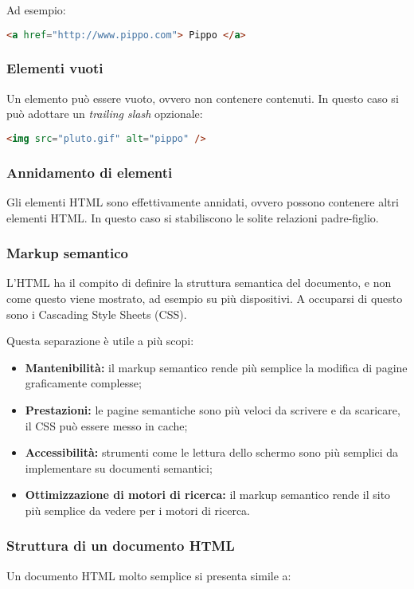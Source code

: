 \documentclass[a4paper,11pt]{article}
\begin{document}
Ad esempio: 
\begin{lstlisting}[language=html, style=codestyle]	
<a href="http://www.pippo.com"> Pippo </a>
\end{lstlisting}

\subsubsection{Elementi vuoti}
Un elemento può essere vuoto, ovvero non contenere contenuti.
In questo caso si può adottare un \textit{trailing slash} opzionale:
\begin{lstlisting}[language=html, style=codestyle]	
<img src="pluto.gif" alt="pippo" />
\end{lstlisting}

\subsubsection{Annidamento di elementi}
Gli elementi HTML sono effettivamente annidati, ovvero possono contenere altri elementi HTML.
In questo caso si stabiliscono le solite relazioni padre-figlio.

\subsubsection{Markup semantico}
L'HTML ha il compito di definire la struttura semantica del documento, e non come questo viene mostrato, ad esempio su più dispositivi. 
A occuparsi di questo sono i Cascading Style Sheets (CSS).

Questa separazione è utile a più scopi:
\begin{itemize}
	\item \textbf{Mantenibilità:} il markup semantico rende più semplice la modifica di pagine graficamente complesse;
	\item \textbf{Prestazioni:} le pagine semantiche sono più veloci da scrivere e da scaricare, il CSS può essere messo in cache;
	\item \textbf{Accessibilità:} strumenti come le lettura dello schermo sono più semplici da implementare su documenti semantici;
	\item \textbf{Ottimizzazione di motori di ricerca:} il markup semantico rende il sito più semplice da vedere per i motori di ricerca.
\end{itemize}

\subsubsection{Struttura di un documento HTML}
Un documento HTML molto semplice si presenta simile a:
\end{document}
